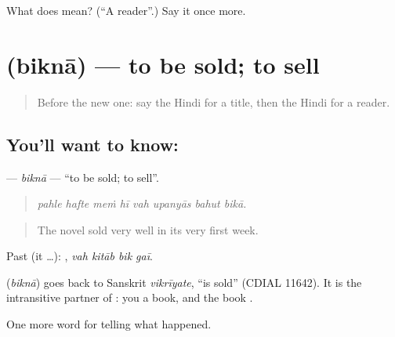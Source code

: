 \begin{tcolorbox}[breakable,colback=teal!4,colframe=teal!35!black,title={Before you move on}]
What does  mean? (\textquotedblleft{}A reader\textquotedblright{}.) Say it once more.
\end{tcolorbox}
\section[\texorpdfstring{\hi{बिकना} (biknā)}{बिकना (biknā)}]{ (biknā) — to be sold; to sell}

\label{lesson:HI-C341-bikna}



\begin{quote}
Before the new one: say the Hindi for a title, then the Hindi for a reader.
\end{quote}

\subsection*{You'll want to know: }
\textbf{} — \emph{biknā} — \textquotedblleft{}to be sold; to sell\textquotedblright{}.

\begin{quote}
       
\end{quote}

\begin{quote}
\emph{pahle hafte meṁ hī vah upanyās bahut bikā.}
\end{quote}

\begin{quote}
The novel sold very well in its very first week.
\end{quote}

Past (it …):    , \emph{vah kitāb bik gaī}.

\begin{cousinweb}
\textbf{} (\emph{biknā}) goes back to Sanskrit \emph{vikrīyate}, \textquotedblleft{}is sold\textquotedblright{} (CDIAL 11642). It is the intransitive partner of \textbf{}: you \textbf{ } a book, and the book \textbf{ }.
\end{cousinweb}

\begin{grammarlens}[title={What you've built}]
One more word for telling what happened.
\end{grammarlens}

